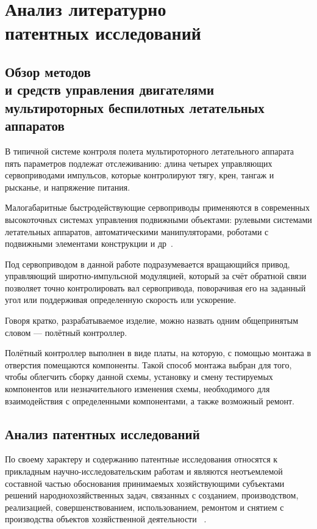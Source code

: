 \section{Анализ литературно \\
  патентных исследований}



\subsection{Обзор методов \\
  и средств управления  двигателями \\
  мультироторных беспилотных летательных аппаратов}

В типичной системе контроля полета
мультироторного летательного аппарата
пять параметров подлежат отслеживанию: длина четырех управляющих
сервоприводами импульсов, которые контролируют тягу, крен, тангаж и
рысканье, и напряжение питания.

Малогабаритные быстродействующие сервоприводы применяются в
современных высокоточных системах управления подвижными объектами:
рулевыми системами летательных аппаратов, автоматическими
манипуляторами, роботами с подвижными элементами конструкции и
др~\cite{dyakovSUBSTANTIATIONRELIABILITYSERVOMOTORS2023}.

Под сервоприводом в данной работе подразумевается вращающийся привод,
управляющий широтно-импульсной модуляцией, который за счёт обратной
связи позволяет точно контролировать вал сервопривода, поворачивая его
на заданный угол или поддерживая определенную скорость или ускорение.

Говоря кратко, разрабатываемое изделие, можно назвать одним
общепринятым словом — полётный контроллер.

Полётный контроллер выполнен в виде платы, на которую, с помощью
монтажа в отверстия помещаются компоненты. Такой способ монтажа выбран
для того, чтобы облегчить сборку данной схемы, установку и смену
тестируемых компонентов или незначительного изменения схемы,
необходимого для взаимодействия с определенными компонентами, а также
возможный ремонт.


\subsection{Анализ патентных исследований}

По своему характеру и содержанию патентные исследования относятся к
прикладным научно-исследовательским работам и являются неотъемлемой
составной частью обоснования принимаемых хозяйствующими субъектами
решений народнохозяйственных задач, связанных с созданием,
производством, реализацией, совершенствованием, использованием,
ремонтом и снятием с производства
объектов хозяйственной деятельности ~\cite{GOST-R-15.011-96}.

\newpage
